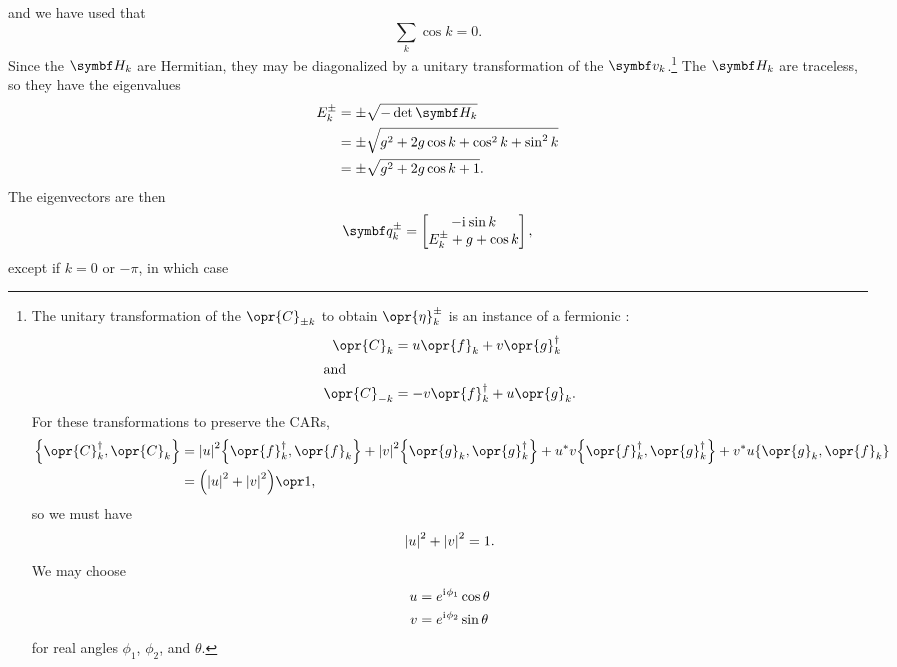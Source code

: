\documentclass[../thesis.tex]{subfiles}
\begin{document}
and we have used that
\begin{equation}
  \sum_k \cos k = 0.
\end{equation}
Since the $\mq{H}_k$ are Hermitian, they may be diagonalized by a unitary
transformation of the $\vq{v}_k$.\footnote{%
  The unitary transformation of the $\opr{C}_{\pm k}$ to obtain
  $\opr{\eta}_k^\pm$ is an instance of a fermionic :
  \begin{subequations}
    \begin{align}
      \opr{C}_k
    &= u\opr{f}_k + v\opr{g}_k^\dag \\
    \shortintertext{and}
    \opr{C}_{-k}
    &= -v\opr{f}_k^\dag + u\opr{g}_k.
    \end{align}\label{eq:bogoliubov}
  \end{subequations}
  For these transformations to preserve the CARs,
  \begin{align}
    \acomm{\opr{C}_k^\dag}{\opr{C}_k}
    &= \abs{u}^2 \acomm{\opr{f}_k^\dag}{\opr{f}_k}
    + \abs{v}^2 \acomm{\opr{g}_k}{\opr{g}_k^\dag}
    + u^* v \acomm{\opr{f}_k^\dag}{\opr{g}_k^\dag}
    + v^* u \acomm{\opr{g}_k}{\opr{f}_k} \\
    &= \qty(\abs{u}^2 + \abs{v}^2) \idopr,
  \end{align}
  so we must have
  \begin{equation}
    \abs{u}^2 + \abs{v}^2 = 1.
  \end{equation}
  We may choose
  \begin{subequations}
    \begin{align}
      u &= e^{\mathrm{i}\mkern1mu\phi_1}\cos\theta \\
      v &= e^{\mathrm{i}\mkern1mu\phi_2}\sin\theta
    \end{align}\label{eq:uv-param}
  \end{subequations}
  for real angles $\phi_1$, $\phi_2$, and $\theta$.
}
The $\mq{H}_k$ are traceless, so they have the eigenvalues
\begin{align}
  E_k^\pm
  &= \pm\sqrt{-\det\mq{H}_k} \\
  &= \pm\sqrt{g^2 + 2g\cos k + \cos^2 k + \sin^2 k} \\
  &= \pm\sqrt{g^2 + 2g\cos k + 1}.
\end{align}
The eigenvectors are then
\begin{equation}
  \vq{q}_k^\pm
  = \bmqty{%
    -\im\sin k \\
    E_k^\pm + g + \cos k
  },
\end{equation}
except if $k = 0$ or $-\pi$, in which case
\end{document}
